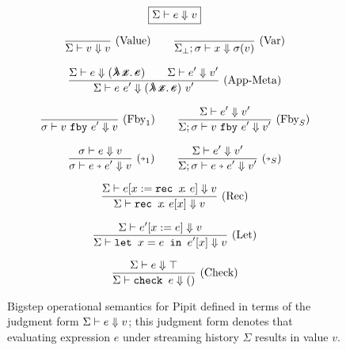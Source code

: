 \begin{figure}
  \[ \boxed{\Sigma \vdash e \Downarrow v} \]

  \[
    \enskip \frac {\displaystyle } {\displaystyle \Sigma \vdash v \Downarrow v} \  \mbox{(Value)} \enskip
    \quad
    \enskip \frac {\displaystyle } {\displaystyle \Sigma_\bot; \sigma \vdash x \Downarrow \sigma(v)} \  \mbox{(Var)} \enskip
  \]

  \[
    \ruleIN{
      \bigstep{\Sigma}{e}{(\mlamX)}
      \qquad
      \bigstep{\Sigma}{e'}{v'}
    }{\bigstep{\Sigma}{e~e'}{(\mlamX)~v'}}{App-Meta}
  \]


  \[
    \enskip \frac {\displaystyle } {\displaystyle \sigma \vdash v~\texttt{fby}~e' \Downarrow v} \  \mbox{($\mbox{Fby}_1$)} \enskip
    \quad
    \enskip \frac {\displaystyle \Sigma \vdash e' \Downarrow v'} {\displaystyle \Sigma; \sigma \vdash v~\texttt{fby}~e' \Downarrow v'} \  \mbox{($\mbox{Fby}_S$)} \enskip
  \]

  \[
    \ruleIN{\bigstep{\sigma}{e}{v}}{\bigstep{\sigma}{\xthen{e}{e'}}{v}}{$\xthenarrow_1$}
    \quad
    \ruleIN{\bigstep{\Sigma}{e'}{v'}}{\bigstep{\Sigma; \sigma}{\xthen{e}{e'}}{v'}}{$\xthenarrow_S$}
  \]

  \[
    \enskip \frac {\displaystyle 
      \Sigma \vdash e[x := \texttt{rec~} x \!.~e] \Downarrow v
    } {\displaystyle 
      \Sigma \vdash \texttt{rec~} x \!.~e[x] \Downarrow v
    } \  \mbox{(Rec)} \enskip
  \]

  \[
    \enskip \frac {\displaystyle 
      \Sigma \vdash e'[x := e] \Downarrow v
    } {\displaystyle 
      \Sigma \vdash \texttt{let~} x = e \texttt{~in~} e'[x] \Downarrow v
    } \  \mbox{(Let)} \enskip
  \]

  \[
    \enskip \frac {\displaystyle 
      \Sigma \vdash e \Downarrow \top
    } {\displaystyle 
      \Sigma \vdash \texttt{check~} e \Downarrow ()
    } \  \mbox{(Check)} \enskip
  \]

  \caption{Bigstep operational semantics for Pipit defined in terms of the judgment form $\Sigma \vdash e \Downarrow v$; this judgment form denotes that evaluating expression $e$ under streaming history $\Sigma$ results in value $v$.}\label{f:core-bigstep}
\end{figure}